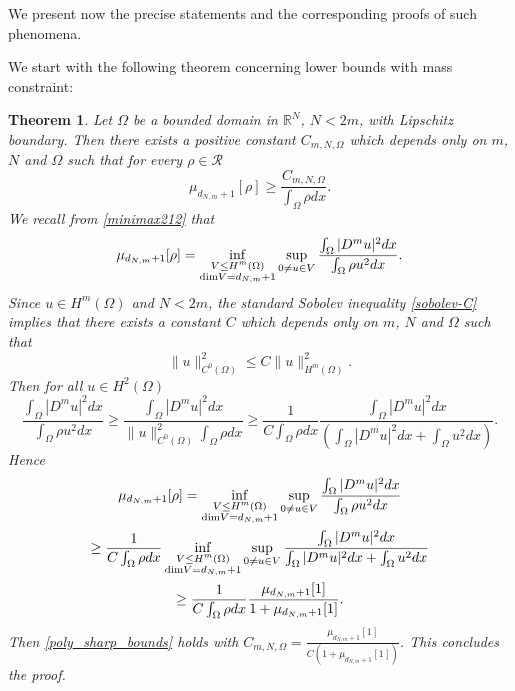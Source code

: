 \documentclass[11pt,a4paper]{amsart}
\numberwithin{equation}{section}
\newtheorem{thm}[equation]{Theorem}
\begin{document}
We present now the precise statements and the corresponding proofs of such phenomena.

We start with the following theorem concerning lower bounds with mass constraint:

\begin{thm}\label{lowerbound_mass}
Let $\Omega$ be a bounded domain in $\mathbb R^N$, $N<2m$, with Lipschitz boundary. Then there exists a positive constant $C_{m,N,\Omega}$ which depends only on $m$, $N$ and $\Omega$ such that for every $\rho\in\mathcal R$
\begin{equation}\label{poly_sharp_bounds}
\mu_{d_{N,m}+1}[\rho]\geq \frac{C_{m,N,\Omega}}{\int_{\Omega}\rho dx}.
\end{equation}
\proof
We recall from \eqref{minimax212} that
$$
\mu_{d_{N,m}+1}[\rho]=\inf_{\substack{V\leq H^m(\Omega)\\{\rm dim}V=d_{N,m}+1}}\sup_{\substack{0\ne u\in V}}\frac{\int_{\Omega}|D^mu|^2dx}{\int_{\Omega}\rho u^2dx}.
$$
Since $u\in H^m(\Omega)$ and $N<2m$, the standard Sobolev inequality \eqref{sobolev-C} implies that there exists a constant $C$ which depends only on $m$, $N$ and $\Omega$ such that
$$
\|u\|_{C^0(\Omega)}^2\leq C\|u\|_{H^m(\Omega)}^2.
$$
Then for all $u\in H^2(\Omega)$
$$
\frac{\int_{\Omega}|D^mu|^2dx}{\int_{\Omega}\rho u^2dx}\geq\frac{\int_{\Omega}|D^mu|^2dx}{\|u\|_{C^0(\Omega)}^2\int_{\Omega}\rho dx}\geq\frac{1}{C\int_{\Omega}\rho dx}\frac{\int_{\Omega}|D^m u|^2dx}{(\int_{\Omega}|D^m u|^2dx+\int_{\Omega}u^2dx)}.
$$
Hence
\begin{multline*}
\mu_{d_{N,m}+1}[\rho]=\inf_{\substack{V\leq H^m(\Omega)\\{\rm dim}V=d_{N,m}+1}}\sup_{\substack{0\ne u\in V}}\frac{\int_{\Omega}|D^mu|^2dx}{\int_{\Omega}\rho u^2dx}\\
\geq \frac{1}{C\int_{\Omega}\rho dx}\inf_{\substack{V\leq H^m(\Omega)\\{\rm dim}V=d_{N,m}+1}}\sup_{\substack{0\ne u\in V}}\frac{\int_{\Omega}|D^mu|^2dx}{\int_{\Omega}|D^m u|^2dx+\int_{\Omega}u^2dx}\\
\geq\frac{1}{C\int_{\Omega}\rho dx}\frac{\mu_{d_{N,m}+1}[1]}{1+\mu_{d_{N,m}+1}[1]}.
\end{multline*}
Then \eqref{poly_sharp_bounds} holds with $C_{m,N,\Omega}=\frac{\mu_{d_{N,m}+1}[1]}{C(1+\mu_{d_{N,m}+1}[1])}$. This concludes the proof.
\endproof
\end{thm}
\end{document}
